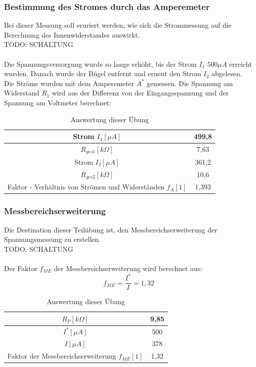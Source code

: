 \subsubsection{Bestimmung des Stromes durch das Amperemeter}
Bei dieser Messung soll eruriert werden, wie sich die Strommessung auf die Berechnung des Innenwiderstandes auswirkt.
~\\
TODO: SCHALTUNG		\\
~\\
Die Spannungsversorgung wurde so lange erhöht, bis der Strom $I_1$ $500\mu A$ erreicht wurden. Danach wurde der Bügel entfernt und erneut den Strom $I_2$ abgelesen. Die Ströme wurden mit dem Amperemeter $A^*$ gemessen.
Die Spannung am Widerstand $R_1$ wird aus der Differenz von der Eingangsspannung und der Spannung am Voltmeter berechnet:
\begin{table}[h]
	\centering
	\begin{tabular}{|c|c|}
	\hline 
	Strom $I_1 [\mu A]$		& 499,8	\\ 
	\hline 
	$R_{ges1} [k\Omega]$		& 7,63	\\ 
	\hline 
	Strom $I_2 [\mu A]$ 		& 361,2	\\ 
	\hline 
	$R_{ges2} [k\Omega]$		& 10,6	\\ 
	\hline 
	Faktor - Verhältnis von Strömen und Widerständen $f_A [1]$			& 1,393	\\ 
	\hline 
	\end{tabular}
	\caption{Auswertung dieser Übung}
\end{table}

\subsubsection{Messbereichserweiterung}
Die Destination dieser Teilübung ist, den Messbereichserweiterung der Spannungsmessung zu erstellen.
~\\
TODO: SCHALTUNG		\\
~\\
Der Faktor $f_{ME}$ der Messbereichserweiterung wird berechnet aus:
\begin{equation}
	f_{ME} = \dfrac{I^*}{I} = 1,32
\end{equation}
\begin{table}[!h]
	\centering
	\begin{tabular}{|c|c|}
	\hline 
	$R_P [k\Omega]$						& 9,85 	\\ 
	\hline 
	$I^* [\mu A]$						& 500	\\ 
	\hline 
	$I [\mu A]$							& 378	\\ 
	\hline 
	Faktor der Messbereichserweiterung $f_{ME} [1]$	& 1,32	\\ 
	\hline 
	\end{tabular}
	\caption{Auswertung dieser Übung}
\end{table}

